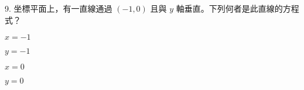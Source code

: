 \documentclass[12pt]{article}
\begin{document}
\begin{problem}
  \item[9.] 坐標平面上，有一直線通過 $(-1, 0)$ 且與 $y$ 軸垂直。下列何者是此直線的方程式？
  \begin{choices}
    \item $x = -1$
    \item $y = -1$
    \item $x = 0$
    \item $y = 0$
  \end{choices}
\end{problem}
\end{document}
